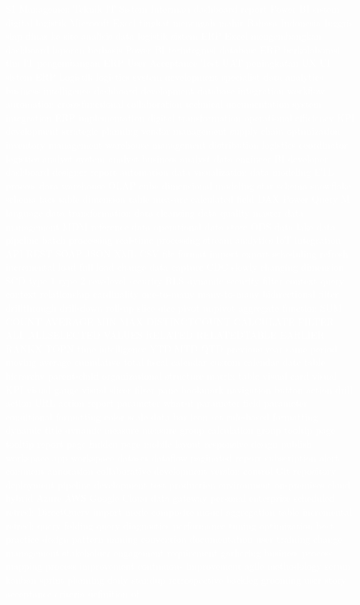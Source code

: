\documentclass[a4paper,10pt]{article}
\begin{document}
\textcolor{white}{%
S1 Managemen Teknik IT Sistem Informasi dashboard report Power BI sistem digital logistik Microsoft Excel tingkat menengah mahir Bahasa Indonesia Inggris siap dinas ke site analisis data logistik sistem ERP Excel mengembangkan dashboard laporan berbasis Power BI terintegrasi database ERP berkolaborasi tim IT pengembangan ERP User Acceptance Test UAT peningkatan UX UI sistem ERP Logistik logistics system development specialist data analytics business intelligence dashboard development database integration workflow automation cross-functional collaboration technical documentation system integration ERP implementation digital transformation operational efficiency KPI development strategic planning vendor management supply chain optimization inventory management warehouse management distribution logistics coordinator logistics analyst system analyst business analyst data engineer BI developer dashboard designer report automation data visualization data modeling ETL process data warehouse OLAP cube dimensional modeling star schema snowflake schema fact table dimension table measure calculated field DAX Power Query M language data transformation data cleansing data quality master data management MDM reference data operational data store ODS data lake data pipeline batch processing real-time processing stream analytics IoT integration API REST SOAP JSON XML CSV file format import export scheduling refresh incremental load full load change data capture CDC slowly changing dimension SCD type 1 type 2 row-level security RLS dynamic security filter context query context relationship cardinality one-to-many many-to-many bidirectional filter drillthrough drill-down roll-up slice dice pivot unpivot aggregate function SUM COUNT AVERAGE MIN MAX DISTINCTCOUNT CALCULATE FILTER ALL ALLSELECTED VALUES RELATED RELATEDTABLE EARLIER RANKX TOPN time intelligence YTD MTD QTD previous year same period moving average cumulative total fiscal calendar custom calendar date table hierarchy parent-child organizational structure matrix table visual card visual KPI visual gauge visual slicer filter pane bookmark navigation button action drill action URL action report parameter what-if parameter field parameter conditional formatting color scale data bar icon set rule-based formatting dynamic title dynamic measure measure group calculation group tooltip page tooltip report page hidden page mobile layout responsive design publish workspace app workspace dataset dataflow paginated report subscription alert comment annotation collaborative development version control Git repository deployment pipeline development test production environment on-premises cloud hybrid Azure AWS Google Cloud data gateway personal enterprise scheduled refresh DirectQuery import mode composite model aggregation table incremental refresh query folding query diagnostics performance tuning optimization best practice design pattern naming convention documentation user training change management stakeholder engagement requirement gathering business process mapping process improvement continuous improvement agile methodology scrum kanban sprint planning daily standup retrospective backlog grooming user story acceptance criteria definition of }
\end{document}
